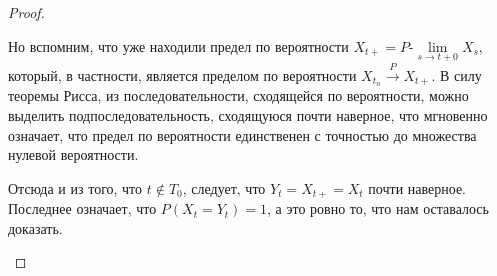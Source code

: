 \begin{proof}
\begin{itemize}
        Но вспомним, что уже находили предел по вероятности $X_{t+} = P\text{-}\lim\limits_{s \to t+0} X_s$, который, в частности, является пределом по вероятности $X_{t_n} \xrightarrow{P} X_{t+}$. В силу теоремы Рисса, из последовательности, сходящейся по вероятности, можно выделить подпоследовательность, сходящуюся почти наверное, что мгновенно означает, что предел по вероятности единственен с точностью до множества нулевой вероятности.
        
        Отсюда и из того, что $t \notin T_0$, следует, что $Y_t = X_{t+} = X_t \text{ почти наверное}$. Последнее означает, что $P(X_t = Y_t) = 1$, а это ровно то, что нам оставалось доказать.
    \end{itemize}
\end{proof}